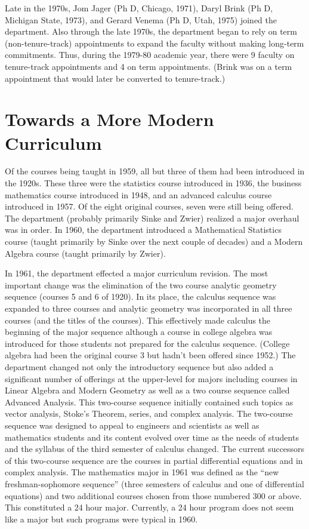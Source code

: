 \documentclass[
]{book}
\begin{document}
Late in the 1970s, Jom Jager (Ph D, Chicago, 1971), Daryl Brink (Ph D, Michigan State, 1973), and Gerard Venema (Ph D, Utah, 1975) joined the department. Also through the late 1970s, the department began to rely on term (non-tenure-track) appointments to expand the faculty without making long-term commitments. Thus, during the 1979-80 academic year, there were 9 faculty on tenure-track appointments and 4 on term appointments. (Brink was on a term appointment that would later be converted to tenure-track.)

\hypertarget{towards-a-more-modern-curriculum}{%
\section{Towards a More Modern Curriculum}\label{towards-a-more-modern-curriculum}}

Of the courses being taught in 1959, all but three of them had been introduced in the 1920s. These three were the statistics course introduced in 1936, the business mathematics course introduced in 1948, and an advanced calculus course introduced in 1957. Of the eight original courses, seven were still being offered. The department (probably primarily Sinke and Zwier) realized a major overhaul was in order. In 1960, the department introduced a Mathematical Statistics course (taught primarily by Sinke over the next couple of decades) and a Modern Algebra course (taught primarily by Zwier).

In 1961, the department effected a major curriculum revision. The most important change was the elimination of the two course analytic geometry sequence (courses 5 and 6 of 1920). In its place, the calculus sequence was expanded to three courses and analytic geometry was incorporated in all three courses (and the titles of the courses). This effectively made calculus the beginning of the major sequence although a course in college algebra was introduced for those students not prepared for the calculus sequence. (College algebra had been the original course 3 but hadn't been offered since 1952.) The department changed not only the introductory sequence but also added a significant number of offerings at the upper-level for majors including courses in Linear Algebra and Modern Geometry as well as a two course sequence called Advanced Analysis. This two-course sequence initially contained such topics as vector analysis, Stoke's Theorem, series, and complex analysis. The two-course sequence was designed to appeal to engineers and scientists as well as mathematics students and its content evolved over time as the needs of students and the syllabus of the third semester of calculus changed. The current successors of this two-course sequence are the courses in partial differential equations and in complex analysis. The mathematics major in 1961 was defined as the ``new freshman-sophomore sequence'' (three semesters of calculus and one of differential equations) and two additional courses chosen from those numbered 300 or above. This constituted a 24 hour major. Currently, a 24 hour program does not seem like a major but such programs were typical in 1960.
\end{document}
